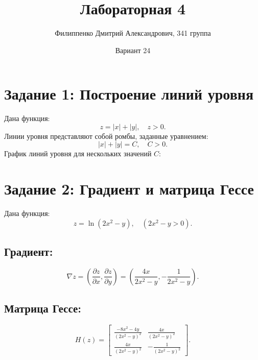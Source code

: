 \documentclass[a4paper,12pt]{article}
\title{Лабораторная 4}
\author{Филиппенко Дмитрий Александрович, 341 группа}
\date{Вариант 24}
\begin{document}
\maketitle

\section*{Задание 1: Построение линий уровня}
Дана функция:
\[
z = |x| + |y|, \quad z > 0.
\]
Линии уровня представляют собой ромбы, заданные уравнением:
\[
|x| + |y| = C, \quad C > 0.
\]
График линий уровня для нескольких значений \( C \):
\begin{center}
\end{center}

\section*{Задание 2: Градиент и матрица Гессе}
Дана функция:
\[
z = \ln(2x^2 - y), \quad (2x^2 - y > 0).
\]

\subsection*{Градиент:}
\[
\nabla z = \left( \frac{\partial z}{\partial x}, \frac{\partial z}{\partial y} \right) = 
\left( \frac{4x}{2x^2 - y}, -\frac{1}{2x^2 - y} \right).
\]

\subsection*{Матрица Гессе:}
\[
H(z) =
\begin{bmatrix}
\frac{-8x^2 - 4y}{(2x^2 - y)^2} & \frac{4x}{(2x^2 - y)^2} \\
\frac{4x}{(2x^2 - y)^2} & -\frac{1}{(2x^2 - y)^2}
\end{bmatrix}.
\]
\end{document}
